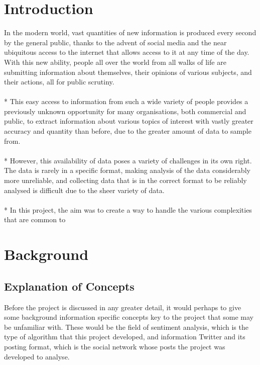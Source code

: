 \documentclass{acm_proc_article-sp}
\begin{document}
\section{Introduction}
	In the modern world, vast quantities of new information is produced every second by the general public, thanks to the advent of social media and the near ubiquitous access to the internet that allows access to it at any time of the day. With this new ability, people all over the world from all walks of life are submitting information about themselves, their opinions of various subjects, and their actions, all for public scrutiny.\\
	\\*
	This easy access to information from such a wide variety of people provides a previously unknown opportunity for many organisations, both commercial and public, to extract information about various topics of interest with vastly greater accuracy and quantity than before, due  to the greater amount of data to sample from. \\
	\\*
	However, this availability of data poses a variety of challenges in its own right. The data is rarely in a specific format, making analysis of the data considerably more unreliable, and collecting data that is in the correct format to be reliably analysed is difficult due to the sheer variety of data. \\ 
	\\*
	In this project, the aim was to create a way to handle the various complexities that are common to 
\section{Background}
	\subsection{Explanation of Concepts}
	Before the project is discussed in any greater detail, it would perhaps to give some background information specific concepts key to the project that some may be unfamiliar with. These would be the field of sentiment analysis, which is the type of algorithm that this project developed, and information Twitter and its posting format, which is the social network whose posts the project was developed to analyse.
\end{document}
